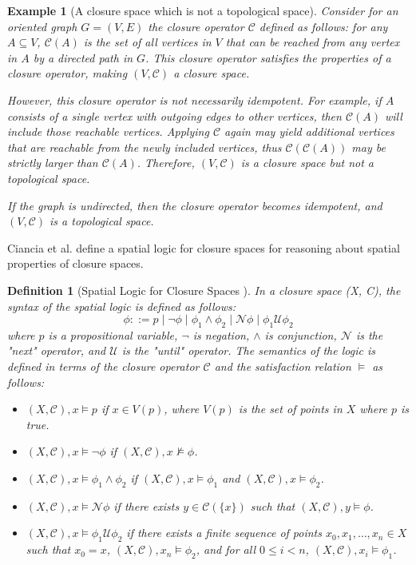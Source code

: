 \documentclass[11pt,a4paper]{article}
\newtheorem{definition}{Definition}
\newtheorem{example}{Example}
\begin{document}
\begin{example} [A closure space which is not a topological space]
    Consider for an oriented graph $G = (V, E)$ the closure operator $\mathcal{C}$ defined as follows: for any $A \subseteq V$, $\mathcal{C}(A)$ is the set of all vertices in $V$ that can be reached from any vertex in $A$ by a directed path in $G$. This closure operator satisfies the properties of a closure operator, making $(V, \mathcal{C})$ a closure space.

    However, this closure operator is not necessarily idempotent. For example, if $A$ consists of a single vertex with outgoing edges to other vertices, then $\mathcal{C}(A)$ will include those reachable vertices. Applying $\mathcal{C}$ again may yield additional vertices that are reachable from the newly included vertices, thus $\mathcal{C}(\mathcal{C}(A))$ may be strictly larger than $\mathcal{C}(A)$. Therefore, $(V, \mathcal{C})$ is a closure space but not a topological space.

    If the graph is undirected, then the closure operator becomes idempotent, and $(V, \mathcal{C})$ is a topological space. 
\end{example}

Ciancia et al. define a spatial logic for closure spaces for reasoning about spatial properties of closure spaces.
\begin{definition} [Spatial Logic for Closure Spaces \cite{closure-spaces-lmcs}]
    In a closure space (X, C), the syntax of the spatial logic is defined as follows:
    \[
    \phi ::= p \mid \neg \phi \mid \phi_1 \wedge \phi_2 \mid \mathcal{N} \phi \mid \phi_1 \mathcal{U} \phi_2
    \]
    where $p$ is a propositional variable, $\neg$ is negation, $\wedge$ is conjunction, $\mathcal{N}$ is the "next" operator, and $\mathcal{U}$ is the "until" operator. The semantics of the logic is defined in terms of the closure operator $\mathcal{C}$ and the satisfaction relation $\models$ as follows:
    \begin{itemize}
        \item $(X, \mathcal{C}), x \models p$ if $x \in V(p)$, where $V(p)$ is the set of points in $X$ where $p$ is true.
        \item $(X, \mathcal{C}), x \models \neg \phi$ if $(X, \mathcal{C}), x \not\models \phi$.
        \item $(X, \mathcal{C}), x \models \phi_1 \wedge \phi_2$ if $(X, \mathcal{C}), x \models \phi_1$ and $(X, \mathcal{C}), x \models \phi_2$.
        \item $(X, \mathcal{C}), x \models \mathcal{N} \phi$ if there exists $y \in \mathcal{C}(\{x\})$ such that $(X, \mathcal{C}), y \models \phi$.
        \item $(X, \mathcal{C}), x \models \phi_1 \mathcal{U} \phi_2$ if there exists a finite sequence of points $x_0, x_1, \ldots, x_n \in X$ such that $x_0 = x$, $(X, \mathcal{C}), x_n \models \phi_2$, and for all $0 \leq i < n$, $(X, \mathcal{C}), x_i \models \phi_1$.
    \end{itemize}
\end{definition}
\end{document}
